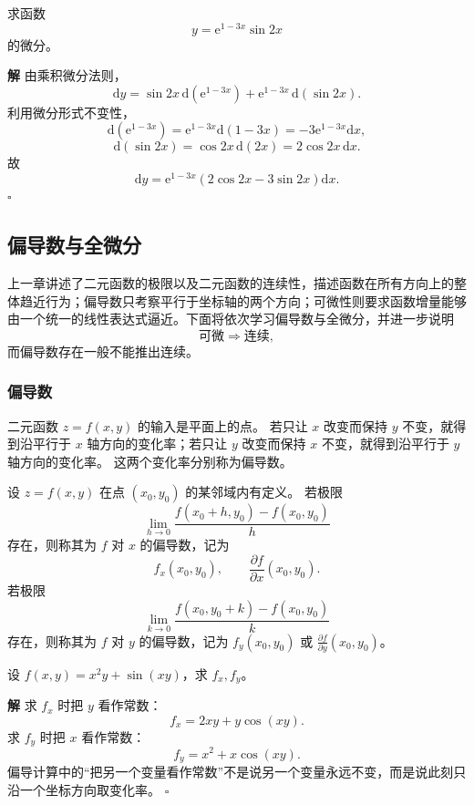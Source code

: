 \documentclass[fontset=fandol]{ctexart}
\newenvironment{solution}{\par\noindent\textbf{解}\quad}{\hfill$\square$\par\vspace{0.8em}}
\newcommand{\dd}{\mathrm{d}}
\newcommand{\ee}{\mathrm{e}}
\begin{document}
\begin{example}[微分形式不变性]
求函数
\[
y=\ee^{1-3x}\sin2x
\]
的微分。
\end{example}
\begin{solution}
由乘积微分法则，
\[
\dd y=\sin2x\,\dd(\ee^{1-3x})+\ee^{1-3x}\,\dd(\sin2x).
\]
利用微分形式不变性，
\[
\dd(\ee^{1-3x})=\ee^{1-3x}\dd(1-3x)=-3\ee^{1-3x}\dd x,
\]
\[
\dd(\sin2x)=\cos2x\,\dd(2x)=2\cos2x\,\dd x.
\]
故
\[
\dd y=\ee^{1-3x}(2\cos2x-3\sin2x)\dd x.
\]
\end{solution}



\subsection{偏导数与全微分}

	
	上一章讲述了二元函数的极限以及二元函数的连续性，描述函数在所有方向上的整体趋近行为；偏导数只考察平行于坐标轴的两个方向；可微性则要求函数增量能够由一个统一的线性表达式逼近。下面将依次学习偏导数与全微分，并进一步说明
	\[
	\text{可微}\Longrightarrow\text{连续},
	\]
	而偏导数存在一般不能推出连续。

\subsubsection*{偏导数}

二元函数 $z=f(x,y)$ 的输入是平面上的点。 若只让 $x$ 改变而保持 $y$ 不变，就得到沿平行于 $x$ 轴方向的变化率；若只让 $y$ 改变而保持 $x$ 不变，就得到沿平行于 $y$ 轴方向的变化率。 这两个变化率分别称为偏导数。

\begin{definition}[偏导数]
设 $z=f(x,y)$ 在点 $(x_0,y_0)$ 的某邻域内有定义。 若极限
\[
\lim_{h\to0}\frac{f(x_0+h,y_0)-f(x_0,y_0)}{h}
\]
存在，则称其为 $f$ 对 $x$ 的偏导数，记为
\[
f_x(x_0,y_0),\qquad \frac{\partial f}{\partial x}(x_0,y_0).
\]
若极限
\[
\lim_{k\to0}\frac{f(x_0,y_0+k)-f(x_0,y_0)}{k}
\]
存在，则称其为 $f$ 对 $y$ 的偏导数，记为 $f_y(x_0,y_0)$ 或 $\frac{\partial f}{\partial y}(x_0,y_0)$。
\end{definition}

\begin{example}[偏导计算]
设 $f(x,y)=x^2y+\sin(xy)$，求 $f_x,f_y$。
\end{example}
\begin{solution}
求 $f_x$ 时把 $y$ 看作常数：
\[
f_x=2xy+y\cos(xy).
\]
求 $f_y$ 时把 $x$ 看作常数：
\[
f_y=x^2+x\cos(xy).
\]
偏导计算中的“把另一个变量看作常数”不是说另一个变量永远不变，而是说此刻只沿一个坐标方向取变化率。
\end{solution}
\end{document}
